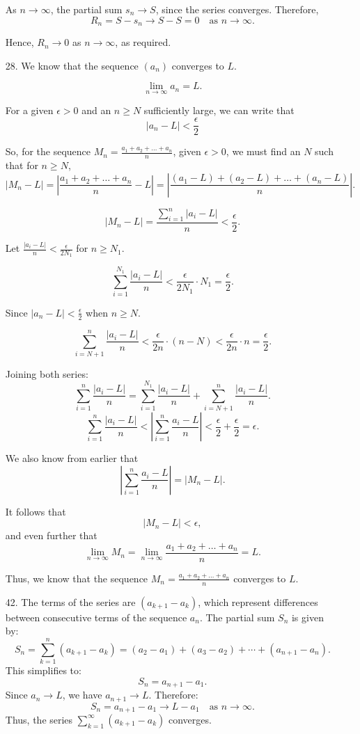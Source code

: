 \documentclass[12pt]{article}
\begin{document}
\begin{enumerate}
As \(n \to \infty\), the partial sum \(s_n \to S\), since the series converges. Therefore,
\[
R_n = S - s_n \to S - S = 0 \quad \text{as } n \to \infty.
\]

Hence, \(R_n \to 0\) as \(n \to \infty\), as required.

\item [28. ]
We know that the sequence $(a_n)$ converges to $L$. 

\[
\lim_{n \to \infty} a_n = L.
\]

For a given $\epsilon > 0$ and an $n \geq N$ sufficiently large, we can write that
\[
|a_n - L| < \frac{\epsilon}{2}
\]

So, for the sequence $M_n = \frac{a_1 + a_2 + \dots + a_n}{n}$, given $\epsilon > 0$, we must find an $N$ such that for $n \geq N$,
\[
|M_n - L| = \left| \frac{a_1 + a_2 + \dots + a_n}{n} - L \right| = \left| \frac{(a_1 - L) + (a_2 - L) + \dots + (a_n - L)}{n} \right|.
\]

\[
|M_n - L| = \frac{\sum_{i=1}^n |a_i - L|}{n} < \frac{\epsilon}{2}.
\]

Let $\frac{|a_i - L|}{n} < \frac{\epsilon}{2N_1}$ for $n \geq N_1$.

\[
\sum_{i=1}^{N_1} \frac{|a_i - L|}{n} < \frac{\epsilon}{2N_1}\cdot N_1 = \frac{\epsilon}{2}.
\]

Since $|a_n - L| < \frac{\epsilon}{2}$ when $n \geq N$.

\[
\sum_{i=N+1}^n \frac{|a_i - L|}{n} < \frac{\epsilon}{2n} \cdot (n - N) < \frac{\epsilon}{2n} \cdot n = \frac{\epsilon}{2}.
\]

Joining both series:
\[
\sum_{i=1}^n \frac{|a_i - L|}{n} = \sum_{i=1}^{N_1} \frac{|a_i - L|}{n} + \sum_{i=N+1}^n \frac{|a_i - L|}{n}.
\]
\[
\sum_{i=1}^n \frac{|a_i - L|}{n} < \left| \sum_{i=1}^n \frac{a_i - L}{n} \right| < \frac{\epsilon}{2} + \frac{\epsilon}{2} = \epsilon.
\]

We also know from earlier that
\[
\left| \sum_{i=1}^n \frac{a_i - L}{n} \right| = |M_n - L|.
\]

It follows that
\[
|M_n - L| < \epsilon,
\]
and even further that
\[
\lim_{n \to \infty} M_n = \lim_{n \to \infty} \frac{a_1 + a_2 + \dots + a_n}{n} = L.
\]

Thus, we know that the sequence $M_n = \frac{a_1 + a_2 + \dots + a_n}{n}$ converges to $L$.

\item [42. ]
The terms of the series are \((a_{k+1} - a_k)\), which represent differences between consecutive terms of the sequence \(a_n\). The partial sum \(S_n\) is given by:
\[
S_n = \sum_{k=1}^n (a_{k+1} - a_k) = (a_2 - a_1) + (a_3 - a_2) + \cdots + (a_{n+1} - a_n).
\]
This simplifies to:
\[
S_n = a_{n+1} - a_1.
\]
Since \(a_n \to L\), we have \(a_{n+1} \to L\). Therefore:
\[
S_n = a_{n+1} - a_1 \to L - a_1 \quad \text{as } n \to \infty.
\]
Thus, the series \(\sum_{k=1}^\infty (a_{k+1} - a_k)\) converges.


\end{enumerate}
\end{document}
